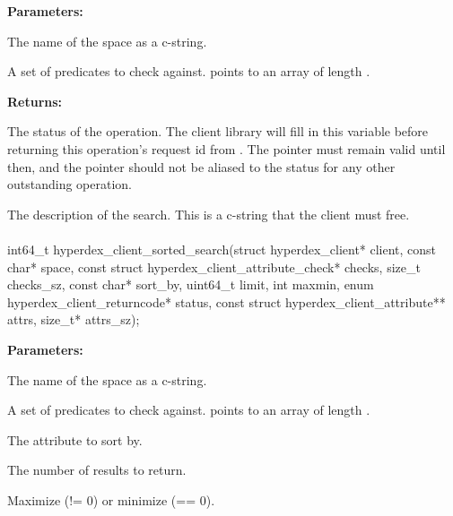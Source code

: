 \noindent\textbf{Parameters:}
\begin{description}[labelindent=\widthof{{\code{checks}, \code{checks\_sz}}},leftmargin=*,noitemsep,nolistsep,align=right]
\item[\code{space}] The name of the space as a c-string.
\item[\code{checks}, \code{checks\_sz}] A set of predicates to check against.   points to an array of length .
\end{description}

\noindent\textbf{Returns:}
\begin{description}[labelindent=\widthof{{\code{description}}},leftmargin=*,noitemsep,nolistsep,align=right]
\item[\code{status}] The status of the operation.  The client library will fill in this variable before returning this operation's request id from .  The pointer must remain valid until then, and the pointer should not be aliased to the status for any other outstanding operation.
\item[\code{description}] The description of the search.  This is a c-string that the client must free.
\end{description}

\paragraph{}
\label{api:c:sorted_search}
\begin{ccode}
int64_t hyperdex_client_sorted_search(struct hyperdex_client* client,
        const char* space,
        const struct hyperdex_client_attribute_check* checks, size_t checks_sz,
        const char* sort_by,
        uint64_t limit,
        int maxmin,
        enum hyperdex_client_returncode* status,
        const struct hyperdex_client_attribute** attrs, size_t* attrs_sz);
\end{ccode}
\funcdesc 

\noindent\textbf{Parameters:}
\begin{description}[labelindent=\widthof{{\code{checks}, \code{checks\_sz}}},leftmargin=*,noitemsep,nolistsep,align=right]
\item[\code{space}] The name of the space as a c-string.
\item[\code{checks}, \code{checks\_sz}] A set of predicates to check against.   points to an array of length .
\item[\code{sort\_by}] The attribute to sort by.
\item[\code{limit}] The number of results to return.
\item[\code{maxmin}] Maximize (!= 0) or minimize (== 0).
\end{description}

